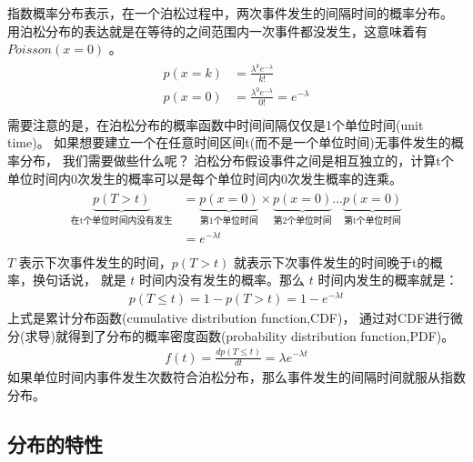 \documentclass[letterpaper,10pt,english]{sphinxmanual}
\begin{document}
指数概率分布表示，在一个泊松过程中，两次事件发生的间隔时间的概率分布。
用泊松分布的表达就是在等待的之间范围内一次事件都没发生，这意味着有
\(Poisson(x=0)\) 。
\begin{align}\label{equation:指数模型/content:指数模型/content:0}\!\begin{aligned}
p(x=k) &= \frac{\lambda^k e^{-\lambda}}{k!}\\
p(x=0) &= \frac{\lambda^0 e^{-\lambda}}{0!} = e^{-\lambda}\\
\end{aligned}\end{align}
需要注意的是，在泊松分布的概率函数中时间间隔仅仅是1个单位时间(unit time)。
如果想要建立一个在任意时间区间t(而不是一个单位时间)无事件发生的概率分布，
我们需要做些什么呢？
泊松分布假设事件之间是相互独立的，计算t个单位时间内0次发生的概率可以是每个单位时间内0次发生概率的连乘。
\begin{align}\label{equation:指数模型/content:指数模型/content:1}\!\begin{aligned}
\underbrace{p(T>t)}_{\text{在t个单位时间内没有发生}}
&= \underbrace{p(x=0 )}_{\text{第1个单位时间}} \times \underbrace{p(x=0)}_{ \text{第2个单位时间}}
...  \underbrace{p(x=0 )}_{\text{第t个单位时间}}\\
&= e^{-\lambda t}\\
\end{aligned}\end{align}
\(T\) 表示下次事件发生的时间，\(p(T>t)\) 就表示下次事件发生的时间晚于t的概率，换句话说，
就是 \(t\) 时间内没有发生的概率。那么 \(t\) 时间内发生的概率就是：
\begin{equation}\label{equation:指数模型/content:指数模型/content:2}
\begin{split}p(T \le t) = 1- p(T>t) = 1 - e^{-\lambda t}\end{split}
\end{equation}
上式是累计分布函数(cumulative distribution function,CDF)，
通过对CDF进行微分(求导)就得到了分布的概率密度函数(probability distribution function,PDF)。
\begin{equation}\label{equation:指数模型/content:指数模型/content:3}
\begin{split}f(t) = \frac{d p(T \le t)}{d t} = \lambda  e^{-\lambda t}\end{split}
\end{equation}
如果单位时间内事件发生次数符合泊松分布，那么事件发生的间隔时间就服从指数分布。


\subsection{分布的特性}
\label{\detokenize{_u6307_u6570_u6a21_u578b/content:id3}}
\end{document}
